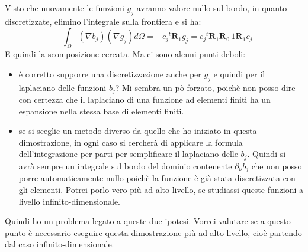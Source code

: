 \documentclass[a4paper,12pt]{report}							%
\begin{document}
Visto che nuovamente le funzioni $g_j$ avranno valore nullo sul bordo, in quanto discretizzate, elimino l'integrale sulla frontiera e si ha:
$$
-\int_{\Omega} (\nabla b_j)(\nabla g_j)d\Omega=-\underline{c_j}^t\mathbf{R}_1\underline{g_j}=\underline{c_j}^t\mathbf{R}_1\mathbf{R}_0^-1\mathbf{R}_1\underline{c_j}
$$
E quindi la scomposizione cercata. Ma ci sono alcuni punti deboli:
\begin{itemize}
\item è corretto supporre una discretizzazione anche per $g_j$ e quindi per il laplaciano delle funzioni $b_j$? Mi sembra un pò forzato, poichè non posso dire con certezza che il laplaciano di una funzione ad elementi finiti ha un espansione nella stessa base di elementi finiti.
\item se si sceglie un metodo diverso da quello che ho iniziato in questa dimostrazione, in ogni caso si cercherà di applicare la formula dell'integrazione per parti per semplificare il laplaciano delle $b_j$. Quindi si avrà sempre un integrale sul bordo del dominio contenente $\partial_{\nu}b_j$ che non posso porre automaticamente nullo poichè la funzione è già stata discretizzata con gli elementi. Potrei porlo vero più ad alto livello, se studiassi queste funzioni a livello infinito-dimensionale.
\end{itemize}
Quindi ho un problema legato a queste due ipotesi. Vorrei valutare se a questo punto è necessario eseguire questa dimostrazione più ad alto livello, cioè partendo dal caso infinito-dimensionale.
\end{document}
